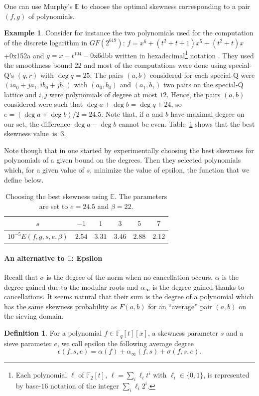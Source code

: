 \documentclass[a4wide]{article}
\newcommand{\F}{{\mathbb F}}
\theoremstyle{plain}
\theoremstyle{definition}
\newtheorem{deff}[theo]{Definition}
\newtheorem{ex}[theo]{Example}
\theoremstyle{remark}
\begin{document}
One can use Murphy's $\mathbb{E}$ to choose the optimal skewness
corresponding to a pair $(f,g)$ of polynomials. 
\begin{ex}
Consider for instance the two
polynomials used for the computation of the discrete logarithm in
$GF(2^{619})$: $f=x^6+(t^2+t+1)x^5+(t^2+t)x$+0x152a and
$g=x-t^{104}-0\text{x6dbb}$ written in hexadecimal\footnote{Each polynomial
	$\ell$ of $\F_2[t]$, $\ell=\sum_i \ell_i t^i$ with
	$\ell_i\in\{0,1\}$, is represented by base-$16$ notation of the integer $\sum_i
\ell_i 2^i$.} notation \cite{BBDGJTVZ12}. They used the smoothness bound $22$ and most of the
computations were done using special-Q's $(q,r)$ with $\deg q=25$. The pairs $(a,b)$
considered for each special-Q were $(ia_0+j a_1,ib_0+jb_1)$ with $(a_0,b_0)$
and $(a_1,b_1)$ two pairs on the special-Q lattice and $i,j$ were
polynomials of degree at most $12$. Hence, the pairs $(a,b)$ considered were
such that $\deg a+\deg b= \deg q+24$, so $e=(\deg a+\deg b)/2=24.5$. Note that, if $a$ and
$b$ have maximal degree on our set, the difference $\deg a-\deg b$ cannot be
even. Table~\ref{choose_skewness} shows that the best skewness value~is~$3$.
\end{ex}

Note though that in \cite{BBDGJTVZ12} one started by experimentally choosing
the best skewness for polynomials of a given bound on the degrees. Then they
selected polynomials which, for a given value of $s$, minimize the value of 
epsilon, the function that we define below.


\begin{table}
	\caption{Choosing the best skewness using $\mathbb{E}$. The
	parameters are set to $e=24.5$ and $\beta=22$.}
	\begin{center}
	\begin{tabular}{|c|ccccc|}
		\hline
		$s$ & $-1$ & $1$ & $3$ & $5$ & $7$\\
		\hline
		$10^{-5}E(f,g,s,e,\beta) $ & $2.54$ & $3.31$ & $3.46$
						 & $2.88$ & $2.12$ \\
		\hline
	\end{tabular}
\end{center}
\label{choose_skewness}
\end{table}


\paragraph{An alternative to $\mathbb{E}$: Epsilon}
Recall that $\sigma$ is the degree of the norm when no cancellation occurs,
$\alpha$ is the degree gained due to the modular roots and
$\alpha_\infty$ is the degree gained thanks to cancellations. It seems
natural that their sum is the degree of a polynomial which has the same
skewness probability as $F(a,b)$ for an ``average'' pair $(a,b)$ on the
sieving domain.
\begin{deff} For a polynomial $f\in\F_q[t][x]$, a skewness
	parameter $s$ and a sieve parameter $e$, we call epsilon the
	following average degree
\begin{equation*} 
\epsilon(f,s,e)=\alpha(f)+\alpha_\infty(f,s)+\sigma(f,s,e).
\end{equation*}
\end{deff}
\end{document}
